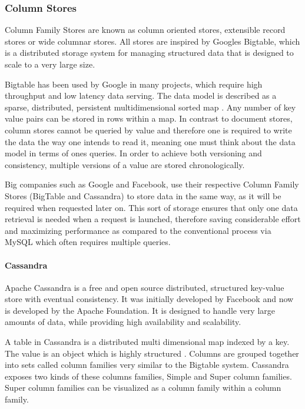 \subsubsection{Column Stores}
Column Family Stores are known as column oriented stores, extensible record stores or wide columnar stores. All stores are inspired by Googles Bigtable, which is a distributed storage system for managing structured data that is designed to scale to a very large size.\cite{Hecht:2011,Chang:2006} 

Bigtable has been used by Google in many projects, which require high throughput and low latency data serving. The data model is described as a sparse, distributed, persistent multidimensional sorted map \cite{Chang:2006} . Any number of key value pairs can be stored in rows within a map. In contrast to document stores, column stores cannot be queried by value and therefore one is required to write the data the way one intends to read it, meaning one must think about the data model in terms of ones queries. In order to achieve both versioning and consistency, multiple versions of a value are stored chronologically. 

Big companies such as Google and Facebook, use their respective Column Family Stores (BigTable and Cassandra) to store data in the same way, as it will be required when requested later on. This sort of storage  ensures that only one data retrieval is needed when a request is launched, therefore saving considerable effort and maximizing performance as compared to the conventional process via MySQL which often requires multiple queries.  

\paragraph{Cassandra}
Apache Cassandra is a free and open source distributed, structured key-value store with eventual consistency. It was initially developed by Facebook and now is developed by the Apache Foundation. It is designed to handle very large amounts of data, while providing high availability and scalability.

A table in Cassandra is a distributed multi dimensional map indexed by a key. The value is an object which is highly structured \cite{biba2011learning}. Columns are grouped together into sets called column families very similar to the Bigtable system. Cassandra exposes two kinds of these columns families, Simple and Super column families. Super column families can be visualized as a column family within a column family\cite{biba2011learning}.


